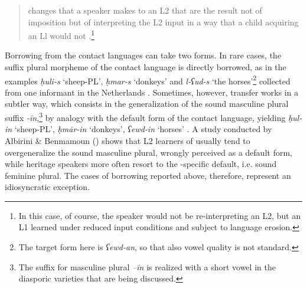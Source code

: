 \documentclass[output=paper]{langsci/langscibook}
\begin{document}
\begin{quote}changes that a speaker makes to an L2 that are the result not of {imposition} but of interpreting the L2 input in a way that a child acquiring an Ll would not \citep[525]{Lucas2015}.\footnote{In this case, of course, the speaker would not be re-interpreting an L2, but an L1 learned under reduced input conditions and subject to {language erosion}.}\end{quote}

Borrowing from the contact languages can take two forms. In rare cases, the suffix plural morpheme of the contact language is directly borrowed, as in the examples \textit{ḥuli-s} ‘sheep-PL’, \textit{ḥmar-s} ‘donkeys’ and \textit{l-ʕud-s} ‘the horses’\footnote{The target form here is \textit{ʕewd-an}, so that also vowel quality is not standard.} collected from one  informant in the Netherlands \citep[274]{BoumansdeRuiter2002}. Sometimes, however, {transfer} works in a subtler way, which consists in the generalization of the sound masculine plural suffix \textit{{}-īn},\footnote{The suffix for masculine plural \textit{–īn} is realized with a short vowel in the diasporic  varieties that are being discussed.} by {analogy} with the default form of the contact language, yielding \textit{ḥul-in} ‘sheep-PL’, \textit{ḥmār-in} ‘donkeys’, \textit{ʕewd-in} ‘horses’ \citep[274]{BoumansdeRuiter2002}. A study conducted by Albirini \& Benmamoun (\citeyear[866–867]{AlbiriniBenmamoun2014}) shows that L2 learners of  usually tend to overgeneralize the sound masculine plural, wrongly perceived as a default form, while {heritage speakers} more often resort to the -specific default, i.e. sound feminine plural. The cases of borrowing reported above, therefore, represent an idiosyncratic exception.
\end{document}
